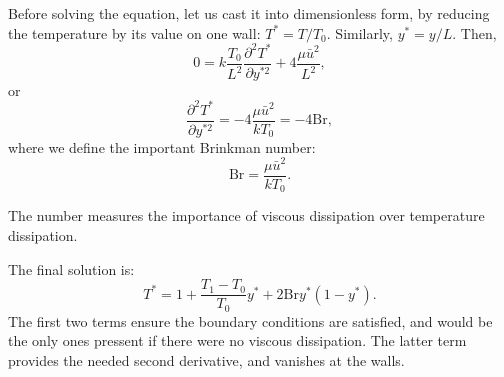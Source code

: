 Before solving the equation, let us cast it into dimensionless form,
by reducing the temperature by its value on one wall: $T^* =
T/T_0$. Similarly, $y^* = y/L$. Then,
\[
0 = k\frac{T_0}{ L^2} \frac{\partial^2 T^*}{\partial y^{*2}} +
4  \frac{ \mu \bar{u}^2  }{L^2} ,
\]
or
\[
 \frac{\partial^2 T^*}{\partial y^{*2}} = 
 -4  \frac{ \mu \bar{u}^2 }{ k T_0 }  =
 -4 \mathrm{Br} ,
\]
where we define the important Brinkman number: 
\begin{equation}
  \label{eq:Brinkman}
  \mathrm{Br} =
  \frac{ \mu \bar{u}^2 }{ k T_0 } .
\end{equation}

The number measures the importance of viscous dissipation over
temperature dissipation.

The final solution is:
\[
T^* = 1 + \frac{T_1-T_0}{T_0} y^* +
2 \mathrm{Br}  y^* \left(1- y^* \right) .
\]
The first two terms ensure the boundary conditions are satisfied, and
would be the only ones pressent if there were no viscous
dissipation. The latter term provides the needed second derivative,
and vanishes at the walls.

